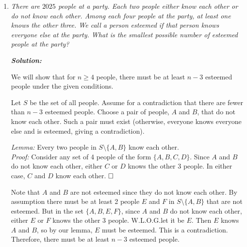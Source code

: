 \documentclass[12pt]{article}
\newcommand{\sol}{\textbf{\textit{Solution: }}}
\begin{document}
\begin{enumerate}[topsep=2\bigskipamount,itemsep=\bigskipamount]
\sol

Notice that $\angle{BDA} = \angle{BDI} = 90^{\circ}$ and $\angle{AEB} = \angle{AEI} = 90^{\circ}$ since a diameter subtends a right angle at the circumference. Thus, $\angle{BDI} = \angle{BFI} = 90^{\circ}$ and $\angle{AEI} = \angle{AGI} = 90^{\circ}$, which gives that quadrilaterals $AGEI$ and $BFDI$ are both cyclic. This yields $\angle{IDF} = 180^{\circ} - \angle{IBF}$ and $\angle{IEG}= 180^{\circ} - \angle{IAG}$, since the opposite angles of a cyclic quadrilateral are supplementary. Finally, $\angle{IAG} = \angle{IAB} = \angle{IED}$ and $\angle{IBF} = \angle{IBA} = \angle{IDE}$ by the angles in the same segment property of cyclic quadrilaterals. Therefore, $\angle{IEG} + \angle{IAG} = 180^{\circ}$ and $\angle{IDF} + \angle{IDE} = 180^{\circ}$, which yields the desired result. $\hfill\blacksquare$

\item \textit{There are \(2025\) people at a party. Each two people either know each other or do not know each other. Among each four people at the party, at least one knows the other three. We call a person \emph{esteemed} if that person knows everyone else at the party. What is the smallest possible number of esteemed people at the party?}

\sol

We will show that for $n \geqslant 4$ people, there must be at least $n-3$ esteemed people under the given conditions.

Let $S$ be the set of all people. Assume for a contradiction that there are fewer than $n-3$ esteemed people. Choose a pair of people, $A$ and $B$, that do not know each other. Such a pair must exist (otherwise, everyone knows everyone else and is esteemed, giving a contradiction).

\textit{Lemma:} Every two people in $S \setminus \{A, B\}$ know each other.\\
\textit{Proof:} Consider any set of 4 people of the form $\{ A,B,C,D \}$. Since $A$ and $B$ do not know each other, either $C$ or $D$ knows the other 3 people. In either case, $C$ and $D$ know each other. $\hfill\square$

Note that $A$ and $B$ are not esteemed since they do not know each other. By assumption there must be at least 2 people $E$ and $F$ in $S \setminus \{A, B\}$ that are not esteemed. But in the set $\{A,B,E,F\}$, since $A$ and $B$ do not know each other, either $E$ or $F$ knows the other 3 people. W.L.O.G.\@ let it be $E$. Then $E$ knows $A$ and $B$, so by our lemma, $E$ must be esteemed. This is a contradiction. Therefore, there must be at least $n-3$ esteemed people.


\end{enumerate}
\end{document}
